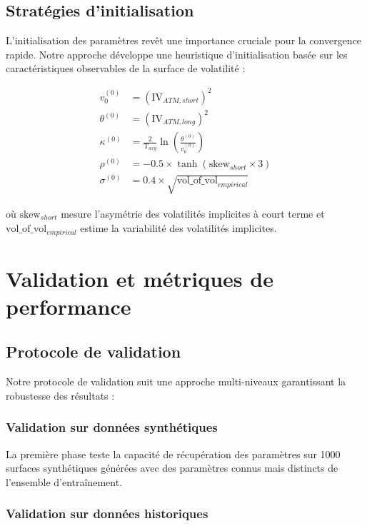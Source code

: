 \subsection{Stratégies d'initialisation}

L'initialisation des paramètres revêt une importance cruciale pour la convergence rapide. Notre approche développe une heuristique d'initialisation basée sur les caractéristiques observables de la surface de volatilité :

\begin{align}
v_0^{(0)} &= \left(\text{IV}_{ATM,short}\right)^2 \\
\theta^{(0)} &= \left(\text{IV}_{ATM,long}\right)^2 \\
\kappa^{(0)} &= \frac{2}{\text{T}_{avg}} \ln\left(\frac{\theta^{(0)}}{v_0^{(0)}}\right) \\
\rho^{(0)} &= -0.5 \times \tanh\left(\text{skew}_{short} \times 3\right) \\
\sigma^{(0)} &= 0.4 \times \sqrt{\text{vol\_of\_vol}_{empirical}}
\end{align}

où $\text{skew}_{short}$ mesure l'asymétrie des volatilités implicites à court terme et $\text{vol\_of\_vol}_{empirical}$ estime la variabilité des volatilités implicites.

\section{Validation et métriques de performance}

\subsection{Protocole de validation}

Notre protocole de validation suit une approche multi-niveaux garantissant la robustesse des résultats :

\subsubsection{Validation sur données synthétiques}

La première phase teste la capacité de récupération des paramètres sur 1000 surfaces synthétiques générées avec des paramètres connus mais distincts de l'ensemble d'entraînement.

\subsubsection{Validation sur données historiques}

